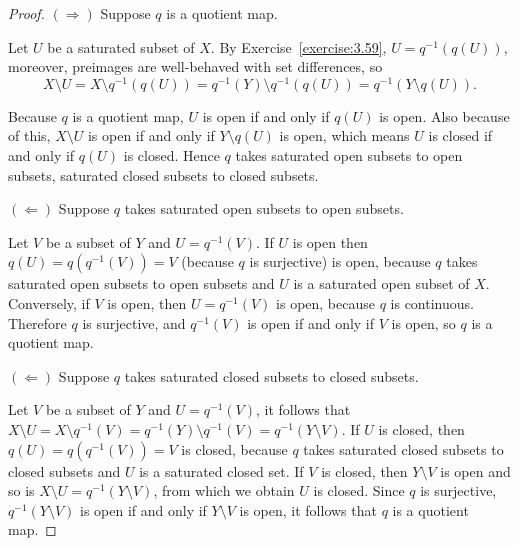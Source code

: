 \begin{proof}
	$(\Rightarrow)$ Suppose $q$ is a quotient map.

	Let $U$ be a saturated subset of $X$. By Exercise~\ref{exercise:3.59}, $U = q^{-1}(q(U))$, moreover, preimages are well-behaved with set differences, so
	\[
		X\setminus U = X\setminus q^{-1}(q(U)) = q^{-1}(Y)\setminus q^{-1}(q(U)) = q^{-1}(Y\setminus q(U)).
	\]

	Because $q$ is a quotient map, $U$ is open if and only if $q(U)$ is open. Also because of this, $X\setminus U$ is open if and only if $Y\setminus q(U)$ is open, which means $U$ is closed if and only if $q(U)$ is closed. Hence $q$ takes saturated open subsets to open subsets, saturated closed subsets to closed subsets.

	$(\Leftarrow)$ Suppose $q$ takes saturated open subsets to open subsets.

	Let $V$ be a subset of $Y$ and $U = q^{-1}(V)$. If $U$ is open then $q(U) = q(q^{-1}(V)) = V$ (because $q$ is surjective) is open, because $q$ takes saturated open subsets to open subsets and $U$ is a saturated open subset of $X$. Conversely, if $V$ is open, then $U = q^{-1}(V)$ is open, because $q$ is continuous. Therefore $q$ is surjective, and $q^{-1}(V)$ is open if and only if $V$ is open, so $q$ is a quotient map.

	$(\Leftarrow)$ Suppose $q$ takes saturated closed subsets to closed subsets.

	Let $V$ be a subset of $Y$ and $U = q^{-1}(V)$, it follows that $X\setminus U = X\setminus q^{-1}(V) = q^{-1}(Y)\setminus q^{-1}(V) = q^{-1}(Y\setminus V)$. If $U$ is closed, then $q(U) = q(q^{-1}(V)) = V$ is closed, because $q$ takes saturated closed subsets to closed subsets and $U$ is a saturated closed set. If $V$ is closed, then $Y\setminus V$ is open and so is $X\setminus U = q^{-1}(Y\setminus V)$, from which we obtain $U$ is closed. Since $q$ is surjective, $q^{-1}(Y\setminus V)$ is open if and only if $Y\setminus V$ is open, it follows that $q$ is a quotient map.
\end{proof}

